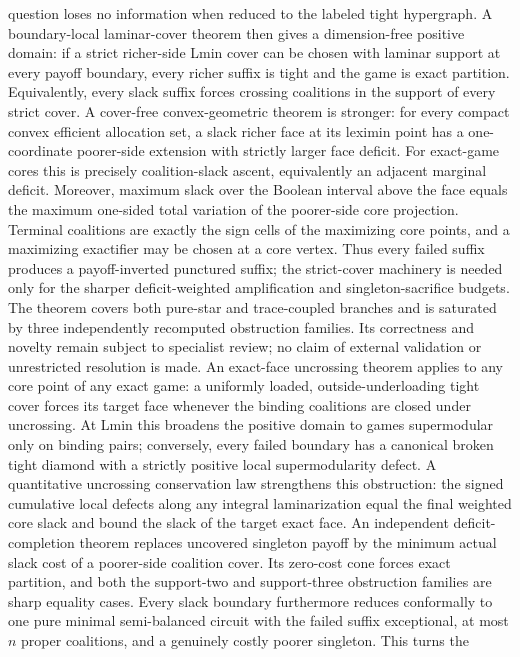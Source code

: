 \documentclass[11pt]{article}
\begin{document}
{question loses no information when reduced to the labeled tight hypergraph.
A boundary-local laminar-cover theorem then gives a dimension-free positive
domain: if a strict richer-side Lmin cover can be chosen with laminar support
at every payoff boundary, every richer suffix is tight and the game is exact
partition.  Equivalently, every slack suffix forces crossing coalitions in
the support of every strict cover.
A cover-free convex-geometric theorem is stronger: for every compact convex
efficient allocation set, a slack richer face at its leximin point has a
one-coordinate poorer-side extension with strictly larger face deficit.
For exact-game cores this is precisely coalition-slack ascent, equivalently
an adjacent marginal deficit.  Moreover, maximum slack over the Boolean
interval above the face equals the maximum one-sided total variation of the
poorer-side core projection.  Terminal coalitions are exactly the sign cells
of the maximizing core points, and a maximizing exactifier may be chosen at
a core vertex.  Thus every failed suffix produces a payoff-inverted punctured
suffix; the strict-cover machinery is needed only for the sharper
deficit-weighted amplification and singleton-sacrifice budgets.  The theorem
covers both pure-star and trace-coupled branches and is saturated by three
independently recomputed obstruction families.  Its correctness and novelty
remain subject to specialist review; no claim of external validation or
unrestricted resolution is made.
An exact-face uncrossing theorem applies to any core point of any exact game:
a uniformly loaded, outside-underloading tight cover forces its target face
whenever the binding coalitions are closed under uncrossing.  At Lmin this
broadens the positive domain to games supermodular only on binding pairs;
conversely, every failed boundary has a canonical broken tight diamond with a
strictly positive local supermodularity defect.
A quantitative uncrossing conservation law strengthens this obstruction:
the signed cumulative local defects along any integral laminarization equal
the final weighted core slack and bound the slack of the target exact face.
An independent deficit-completion theorem replaces uncovered singleton payoff
by the minimum actual slack cost of a poorer-side coalition cover. Its
zero-cost cone forces exact partition, and both the support-two and
support-three obstruction families are sharp equality cases.
Every slack boundary furthermore reduces conformally to one pure minimal
semi-balanced circuit with the failed suffix exceptional, at most $n$
proper coalitions, and a genuinely costly poorer singleton.  This turns the
}
\end{document}
